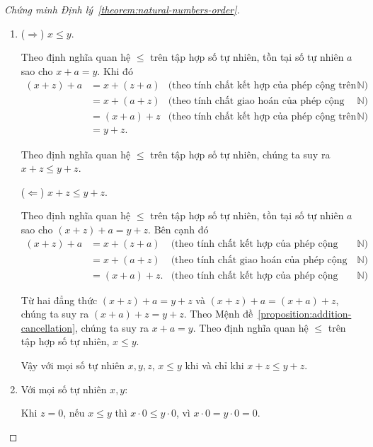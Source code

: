 \begin{proof}[Chứng minh Định lý~\ref{theorem:natural-numbers-order}]
	\begin{enumerate}[label={(\roman*)}]
		\item ($\Rightarrow$) $x\leq y$.

		      Theo định nghĩa quan hệ $\leq$ trên tập hợp số tự nhiên, tồn tại số tự nhiên $a$ sao cho $x + a = y$. Khi đó
		      \begin{align*}
			      (x + z) + a & = x + (z + a) & \text{(theo tính chất kết hợp của phép cộng trên $\mathbb{N}$)}   \\
			                  & = x + (a + z) & \text{(theo tính chất giao hoán của phép cộng trên $\mathbb{N}$)} \\
			                  & = (x + a) + z & \text{(theo tính chất kết hợp của phép cộng trên $\mathbb{N}$)}   \\
			                  & = y + z.
		      \end{align*}

		      Theo định nghĩa quan hệ $\leq$ trên tập hợp số tự nhiên, chúng ta suy ra $x + z\leq y + z$.

		      ($\Leftarrow$) $x + z\leq y + z$.

		      Theo định nghĩa quan hệ $\leq$ trên tập hợp số tự nhiên, tồn tại số tự nhiên $a$ sao cho $(x + z) + a = y + z$. Bên cạnh đó
		      \begin{align*}
			      (x + z) + a & = x + (z + a)  & \text{(theo tính chất kết hợp của phép cộng trên $\mathbb{N}$)}   \\
			                  & = x + (a + z)  & \text{(theo tính chất giao hoán của phép cộng trên $\mathbb{N}$)} \\
			                  & = (x + a) + z. & \text{(theo tính chất kết hợp của phép cộng trên $\mathbb{N}$)}
		      \end{align*}

		      Từ hai đẳng thức $(x + z) + a = y + z$ và $(x + z) + a = (x + a) + z$, chúng ta suy ra $(x + a) + z = y + z$. Theo Mệnh đề~\ref{proposition:addition-cancellation}, chúng ta suy ra $x + a = y$. Theo định nghĩa quan hệ $\leq$ trên tập hợp số tự nhiên, $x\leq y$.

		      Vậy với mọi số tự nhiên $x, y, z$, $x\leq y$ khi và chỉ khi $x + z \leq y + z$.
		\item Với mọi số tự nhiên $x, y$:

		      Khi $z = 0$, nếu $x\leq y$ thì $x\cdot 0\leq y\cdot 0$, vì $x\cdot 0 = y\cdot 0 = 0$.


\end{enumerate}
\end{proof}
